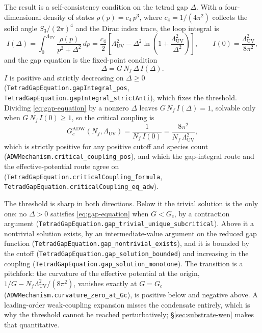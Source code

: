 \documentclass[aps,prd,nofootinbib,superscriptaddress,12pt]{revtex4-2}
\DeclareRobustCommand{\lb}{\discretionary{}{}{}}
\begin{document}
The result is a self-consistency condition on the tetrad gap $\Delta$. With
a four-dimensional density of states $\rho(p) = c_4\,p^{3}$, where
$c_4 = 1/(4\pi^{2})$ collects the solid angle $S_3/(2\pi)^{4}$ and the
Dirac index trace, the loop integral is
\begin{equation}
\label{eq:gap-integral}
I(\Delta)
= \int_{0}^{\Lambda_{\mathrm{UV}}}\!\frac{\rho(p)}{p^{2}+\Delta^{2}}\,dp
= \frac{c_4}{2}\left[\Lambda_{\mathrm{UV}}^{2}
- \Delta^{2}\ln\!\left(1+\frac{\Lambda_{\mathrm{UV}}^{2}}{\Delta^{2}}\right)\right],
\qquad
I(0) = \frac{\Lambda_{\mathrm{UV}}^{2}}{8\pi^{2}},
\end{equation}
and the gap equation is the fixed-point condition
\begin{equation}
\label{eq:gap-equation}
\Delta = G\,N_f\,\Delta\,I(\Delta).
\end{equation}
$I$ is positive and strictly decreasing on $\Delta \ge 0$
(\texttt{Tetrad\lb{}Gap\lb{}Equation.\lb{}gap\lb{}Integral\_\lb{}pos},
\texttt{Tetrad\lb{}Gap\lb{}Equation.\lb{}gap\lb{}Integral\_\lb{}strict\lb{}Anti}), which fixes the
threshold. Dividing \eqref{eq:gap-equation} by a nonzero $\Delta$ leaves
$G\,N_f\,I(\Delta) = 1$, solvable only when $G\,N_f\,I(0) \ge 1$, so the
critical coupling is
\begin{equation}
\label{eq:critical-coupling}
G_c^{\mathrm{ADW}}(N_f,\Lambda_{\mathrm{UV}})
= \frac{1}{N_f\,I(0)}
= \frac{8\pi^{2}}{N_f\,\Lambda_{\mathrm{UV}}^{2}},
\end{equation}
which is strictly positive for any positive cutoff and species count
(\texttt{ADWMechanism.\lb{}critical\_\lb{}coupling\_\lb{}pos}), and which the gap-integral
route and the effective-potential route agree on
(\texttt{Tetrad\lb{}Gap\lb{}Equation.\lb{}critical\lb{}Coupling\_\lb{}formula},
\texttt{Tetrad\lb{}Gap\lb{}Equation.\lb{}critical\lb{}Coupling\_\lb{}eq\_\lb{}adw}).

The threshold is sharp in both directions. Below it the trivial solution is
the only one: no $\Delta > 0$ satisfies \eqref{eq:gap-equation} when
$G < G_c$, by a contraction argument
(\texttt{Tetrad\lb{}Gap\lb{}Equation.\lb{}gap\_\lb{}trivial\_\lb{}unique\_\lb{}subcritical}). Above it a
nontrivial solution exists, by an intermediate-value argument on the
reduced gap function
(\texttt{Tetrad\lb{}Gap\lb{}Equation.\lb{}gap\_\lb{}nontrivial\_\lb{}exists}), and it is bounded by
the cutoff (\texttt{Tetrad\lb{}Gap\lb{}Equation.\lb{}gap\_\lb{}solution\_\lb{}bounded}) and
increasing in the coupling
(\texttt{Tetrad\lb{}Gap\lb{}Equation.\lb{}gap\_\lb{}solution\_\lb{}monotone}). The transition is a
pitchfork: the curvature of the effective potential at the origin,
$1/G - N_f\Lambda_{\mathrm{UV}}^{2}/(8\pi^{2})$, vanishes exactly at
$G = G_c$ (\texttt{ADWMechanism.\lb{}curvature\_\lb{}zero\_\lb{}at\_\lb{}Gc}), is positive
below and negative above. A leading-order weak-coupling expansion misses
the condensate entirely, which is why the threshold cannot be reached
perturbatively; \S\ref{sec:substrate-wen} makes that quantitative.
\end{document}
